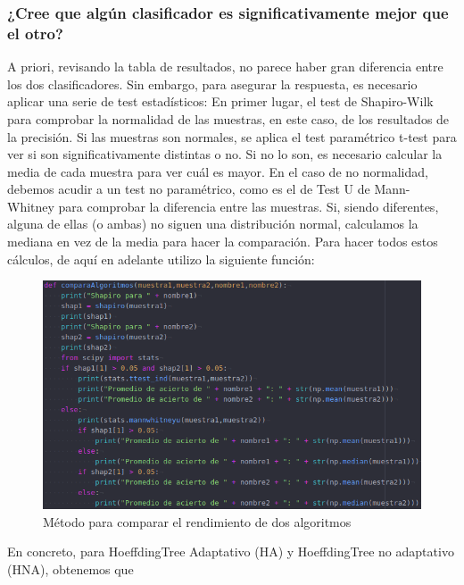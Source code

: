 \subsubsection{¿Cree que algún clasificador es significativamente mejor que el otro?}

A priori, revisando la tabla de resultados, no parece haber gran diferencia entre los dos clasificadores. Sin embargo, para asegurar la respuesta, es necesario aplicar una serie de test estadísticos: En primer lugar, el test de Shapiro-Wilk para comprobar la normalidad de las muestras, en este caso, de los resultados de la precisión. Si las muestras son normales, se aplica el test paramétrico t-test para ver si son significativamente distintas o no. Si no lo son, es necesario calcular la media de cada muestra para ver cuál es mayor. En el caso de no normalidad, debemos acudir a un test no paramétrico, como es el de Test U de Mann-Whitney para comprobar la diferencia entre las muestras. Si, siendo diferentes, alguna de ellas (o ambas) no siguen una distribución normal, calculamos la mediana en vez de la media para hacer la comparación. Para hacer todos estos cálculos, de aquí en adelante utilizo la siguiente función:

\begin{figure}[H] %
	\centering
	\includegraphics[scale=0.45]{comparaAl.png}  %
	\caption{Método para comparar el rendimiento de dos algoritmos} 
	\label{fig:compAl}
\end{figure}

En concreto, para HoeffdingTree Adaptativo (HA) y HoeffdingTree no adaptativo (HNA), obtenemos que

